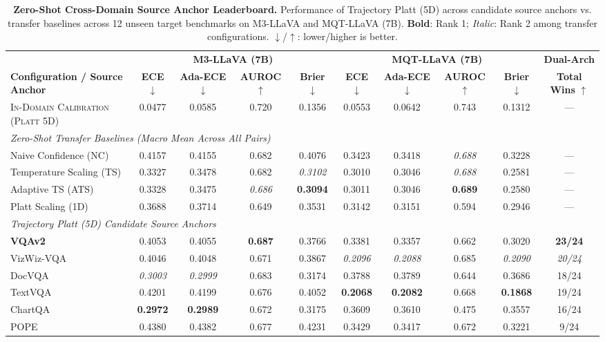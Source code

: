 \begin{table}[t]
\setlength{\tabcolsep}{3.5pt}
\renewcommand{\arraystretch}{1.05}
\centering
\footnotesize
\begin{tabular}{l cccc cccc c}
\toprule
 & \multicolumn{4}{c}{\textbf{M3-LLaVA (7B)}} & \multicolumn{4}{c}{\textbf{MQT-LLaVA (7B)}} & \textbf{Dual-Arch} \\
\cmidrule(lr){2-5} \cmidrule(lr){6-9} \cmidrule(lr){10-10}
\textbf{Configuration / Source Anchor} & \textbf{ECE} $\downarrow$ & \textbf{Ada-ECE} $\downarrow$ & \textbf{AUROC} $\uparrow$ & \textbf{Brier} $\downarrow$ & \textbf{ECE} $\downarrow$ & \textbf{Ada-ECE} $\downarrow$ & \textbf{AUROC} $\uparrow$ & \textbf{Brier} $\downarrow$ & \textbf{Total Wins} $\uparrow$ \\
\midrule
\textsc{In-Domain Calibration (Platt 5D)} & 0.0477 & 0.0585 & 0.720 & 0.1356 & 0.0553 & 0.0642 & 0.743 & 0.1312 & — \\
\midrule
\multicolumn{10}{l}{\textit{Zero-Shot Transfer Baselines (Macro Mean Across All Pairs)}} \\
Naive Confidence (NC) & 0.4157 & 0.4155 & 0.682 & 0.4076 & 0.3423 & 0.3418 & \textit{0.688} & 0.3228 & — \\
Temperature Scaling (TS) & 0.3327 & 0.3478 & 0.682 & \textit{0.3102} & 0.3010 & 0.3046 & \textit{0.688} & 0.2581 & — \\
Adaptive TS (ATS) & 0.3328 & 0.3475 & \textit{0.686} & \textbf{0.3094} & 0.3011 & 0.3046 & \textbf{0.689} & 0.2580 & — \\
Platt Scaling (1D) & 0.3688 & 0.3714 & 0.649 & 0.3531 & 0.3142 & 0.3151 & 0.594 & 0.2946 & — \\
\midrule
\multicolumn{10}{l}{\textit{Trajectory Platt (5D) Candidate Source Anchors}} \\
\textbf{VQAv2} & 0.4053 & 0.4055 & \textbf{0.687} & 0.3766 & 0.3381 & 0.3357 & 0.662 & 0.3020 & \textbf{23/24} \\
VizWiz-VQA & 0.4046 & 0.4048 & 0.671 & 0.3867 & \textit{0.2096} & \textit{0.2088} & 0.685 & \textit{0.2090} & \textit{20/24} \\
DocVQA & \textit{0.3003} & \textit{0.2999} & 0.683 & 0.3174 & 0.3788 & 0.3789 & 0.644 & 0.3686 & 18/24 \\
TextVQA & 0.4201 & 0.4199 & 0.676 & 0.4052 & \textbf{0.2068} & \textbf{0.2082} & 0.668 & \textbf{0.1868} & 19/24 \\
ChartQA & \textbf{0.2972} & \textbf{0.2989} & 0.672 & 0.3175 & 0.3609 & 0.3610 & 0.475 & 0.3557 & 16/24 \\
POPE & 0.4380 & 0.4382 & 0.677 & 0.4231 & 0.3429 & 0.3417 & 0.672 & 0.3221 & 9/24 \\
\bottomrule
\end{tabular}
\caption{\textbf{Zero-Shot Cross-Domain Source Anchor Leaderboard.} Performance of Trajectory Platt (5D) across candidate source anchors vs. transfer baselines across 12 unseen target benchmarks on M3-LLaVA and MQT-LLaVA (7B). \textbf{Bold}: Rank 1; \textit{Italic}: Rank 2 among transfer configurations. $\downarrow$/$\uparrow$: lower/higher is better.}
\label{tab:pairwise_anchor_summary}
\end{table}
